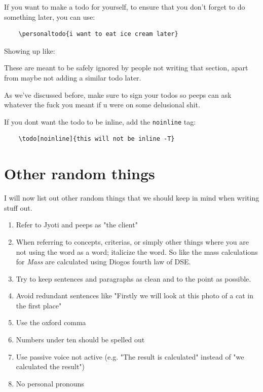 \documentclass[../main.tex]{subfiles}
\begin{document}
If you want to make a todo for yourself, to ensure that you don't forget to do something later, you can use:

\begin{verbatim}
    \personaltodo{i want to eat ice cream later}
\end{verbatim}

Showing up like:


These are meant to be safely ignored by people not writing that section, apart from maybe not adding a similar todo later.

As we've discussed before, make sure to sign your todos so peeps can ask whatever the fuck you meant if u were on some delusional shit.

If you dont want the todo to be inline, add the \texttt{noinline} tag:

\begin{verbatim}
    \todo[noinline]{this will not be inline -T}
\end{verbatim}

\section{Other random things}
I will now list out other random things that we should keep in mind when writing stuff out. 
\begin{enumerate}
    \item Refer to Jyoti and peeps as "the client"
    \item When referring to concepts, criterias, or simply other things where you are not using the word as a word; italicize the word. So like the mass calculations for \textit{Mass} are calculated using Diogos fourth law of DSE. 
    \item Try to keep sentences and paragraphs as clean and to the point as possible. 
    \item Avoid redundant sentences like "Firstly we will look at this photo of a cat in the first place"
    \item Use the oxford comma
    \item Numbers under ten should be spelled out
    \item Use passive voice not active (e.g. "The result is calculated" instead of "we calculated the result")
    \item No personal pronouns
\end{enumerate}
\end{document}
